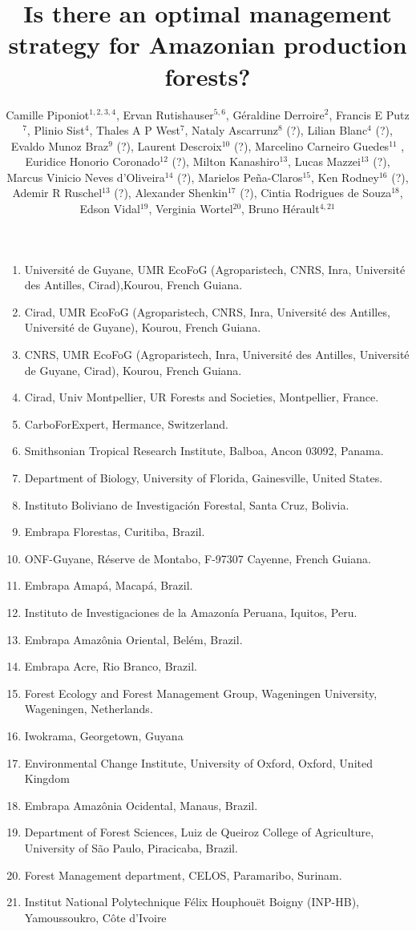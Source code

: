 \documentclass{article}
\title{Is there an optimal management strategy for Amazonian production forests?}
\author{Camille Piponiot$^{1,2,3,4}$, Ervan Rutishauser$^{5,6}$, Géraldine Derroire$^{2}$, Francis E Putz$^{7}$, Plinio Sist$^{4}$, Thales A P West$^{7}$, Nataly Ascarrunz$^{8}$ (?), Lilian Blanc$^{4}$ (?), Evaldo Munoz Braz$^{9}$ (?), Laurent Descroix$^{10}$ (?), Marcelino Carneiro Guedes$^{11}$ , Euridice Honorio Coronado$^{12}$ (?), Milton Kanashiro$^{13}$, Lucas Mazzei$^{13}$ (?), Marcus Vinicio Neves d’Oliveira$^{14}$ (?), Marielos Peña-Claros$^{15}$, Ken Rodney$^{16}$ (?), Ademir R Ruschel$^{13}$ (?), Alexander Shenkin$^{17}$ (?), Cintia Rodrigues de Souza$^{18}$, Edson Vidal$^{19}$, Verginia Wortel$^{20}$, Bruno Hérault$^{4,21}$}
\date{}
\begin{document}
\maketitle 

\begin{enumerate}
\item  Université  de  Guyane,  UMR  EcoFoG  (Agroparistech,  CNRS,  Inra,  Université  des  Antilles,  Cirad),Kourou, French Guiana.
\item Cirad,  UMR  EcoFoG  (Agroparistech,  CNRS,  Inra,  Université  des  Antilles,  Université  de  Guyane), Kourou, French Guiana.
\item CNRS,  UMR  EcoFoG  (Agroparistech,  Inra,  Université des  Antilles,  Université  de  Guyane,  Cirad), Kourou, French Guiana.
\item Cirad, Univ Montpellier, UR Forests and Societies, Montpellier, France.
\item CarboForExpert, Hermance, Switzerland.
\item Smithsonian Tropical Research Institute, Balboa, Ancon 03092, Panama.
\item Department of Biology, University of Florida, Gainesville, United States.
\item Instituto Boliviano de Investigación Forestal, Santa Cruz, Bolivia.
\item Embrapa Florestas, Curitiba, Brazil.
\item ONF-Guyane, Réserve de Montabo, F-97307 Cayenne, French Guiana.
\item Embrapa Amapá, Macapá, Brazil. 
\item Instituto de Investigaciones de la Amazonía Peruana, Iquitos, Peru.
\item Embrapa Amazônia Oriental, Belém, Brazil.
\item Embrapa Acre, Rio Branco, Brazil.
\item Forest Ecology and Forest Management Group, Wageningen University, Wageningen, Netherlands.
\item Iwokrama, Georgetown, Guyana
\item Environmental Change Institute, University of Oxford, Oxford, United Kingdom
\item Embrapa Amazônia Ocidental, Manaus, Brazil.
\item Department of Forest Sciences, Luiz de Queiroz College of Agriculture, University of São Paulo, Piracicaba, Brazil.
\item Forest Management department, CELOS, Paramaribo, Surinam.
\item Institut National Polytechnique Félix Houphouët Boigny (INP-HB), Yamoussoukro, Côte d’Ivoire

\end{enumerate}
\end{document}
